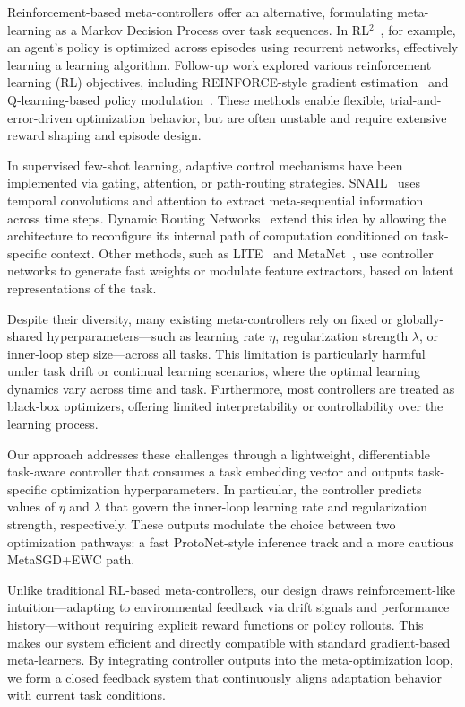 \documentclass[conference]{IEEEtran}
\begin{document}
Reinforcement-based meta-controllers offer an alternative, formulating meta-learning as a Markov Decision Process over task sequences. In RL$^2$~\cite{duan2016rl2}, for example, an agent’s policy is optimized across episodes using recurrent networks, effectively learning a learning algorithm. Follow-up work explored various reinforcement learning (RL) objectives, including REINFORCE-style gradient estimation~\cite{bengio1990learning} and Q-learning-based policy modulation~\cite{xu2018meta}. These methods enable flexible, trial-and-error-driven optimization behavior, but are often unstable and require extensive reward shaping and episode design.

In supervised few-shot learning, adaptive control mechanisms have been implemented via gating, attention, or path-routing strategies. SNAIL~\cite{mishra2018simple} uses temporal convolutions and attention to extract meta-sequential information across time steps. Dynamic Routing Networks~\cite{rosenbaum2018routing} extend this idea by allowing the architecture to reconfigure its internal path of computation conditioned on task-specific context. Other methods, such as LITE~\cite{ravi2018amortized} and MetaNet~\cite{munkhdalai2017meta}, use controller networks to generate fast weights or modulate feature extractors, based on latent representations of the task.

Despite their diversity, many existing meta-controllers rely on fixed or globally-shared hyperparameters—such as learning rate $\eta$, regularization strength $\lambda$, or inner-loop step size—across all tasks. This limitation is particularly harmful under task drift or continual learning scenarios, where the optimal learning dynamics vary across time and task. Furthermore, most controllers are treated as black-box optimizers, offering limited interpretability or controllability over the learning process.

Our approach addresses these challenges through a lightweight, differentiable task-aware controller that consumes a task embedding vector and outputs task-specific optimization hyperparameters. In particular, the controller predicts values of $\eta$ and $\lambda$ that govern the inner-loop learning rate and regularization strength, respectively. These outputs modulate the choice between two optimization pathways: a fast ProtoNet-style inference track and a more cautious MetaSGD+EWC path.

Unlike traditional RL-based meta-controllers, our design draws reinforcement-like intuition—adapting to environmental feedback via drift signals and performance history—without requiring explicit reward functions or policy rollouts. This makes our system efficient and directly compatible with standard gradient-based meta-learners. By integrating controller outputs into the meta-optimization loop, we form a closed feedback system that continuously aligns adaptation behavior with current task conditions.
\end{document}
